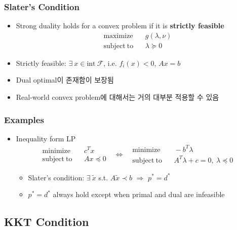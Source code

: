\subsubsection*{Slater's Condition}
\begin{itemize}
    \item Strong duality holds for a convex problem if it is \textbf{strictly feasible}
        $$ \begin{aligned}
            \mathrm{maximize}~~&~~g(\lambda,\nu) \\
            \mathrm{subject~to}~~&~~\lambda\succeq 0
        \end{aligned} $$
    \item Strictly feasible: $\exists~x\in\mathrm{int}~\mathcal{F}$, i.e. $f_i(x)<0$, $Ax=b$
    \item Dual optimal이 존재함이 보장됨
    \item Real-world convex problem에 대해서는 거의 대부분 적용할 수 있음
\end{itemize}

\subsubsection*{Examples}
\begin{itemize}
    \item Inequality form LP
        $$ \begin{aligned}
            \mathrm{minimize}~~&~~c^Tx \\
            \mathrm{subject~to}~~&~~Ax\preceq 0
        \end{aligned}~~~\Leftrightarrow~~~\begin{aligned}
            \mathrm{minimize}~~&~~-b^T\lambda \\
            \mathrm{subject~to}~~&~~A^T\lambda + c = 0,~\lambda\preceq 0
        \end{aligned} $$
    \begin{itemize}
        \item Slater's condition: $\exists~\tilde{x}$ s.t. $A\tilde{x}\prec b$ $\Rightarrow$ $p^\ast=d^\ast$
        \item $p^\ast=d^\ast$ always hold except when primal and dual are infeasible
    \end{itemize}
\end{itemize}

\subsection{KKT Condition}
